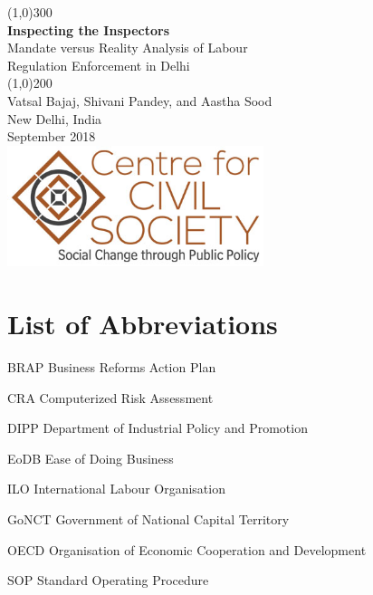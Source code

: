 \documentclass[a4paper, 12pt, twoside]{article}
\begin{document}

\begin{titlepage}
\begin{center}
\line(1,0){300}\\
[0.25in]
\huge{\bfseries\textcolor{CCSbrown} {Inspecting the Inspectors}} \\
[0.5cm]
\large{Mandate versus Reality Analysis of Labour \\Regulation Enforcement in Delhi} \\
    	
\line(1,0){200}\\
[3in]
\LARGE{Vatsal Bajaj, Shivani Pandey, and Aastha Sood} \\ 
[1.5cm]
{\normalsize New Delhi, India} \\
{\normalsize September 2018} \\
[2cm]
\includegraphics[width = 75mm]{CCSlogo.jpg}

\end{center}
\end{titlepage}

\tableofcontents

\newpage
{}

\section*{List of Abbreviations}

\begin{abbrv}
         
        \item[BRAP]			Business Reforms Action Plan
        \item[CRA]			Computerized Risk Assessment
        \item[DIPP]			Department of Industrial Policy and Promotion
        \item[EoDB]			Ease of Doing Business
        \item[ILO]				International Labour Organisation
        \item[GoNCT]			Government of National Capital Territory 
        \item[OECD]			Organisation of Economic Cooperation and Development
        \item[SOP]			Standard Operating Procedure 
              
\end{abbrv}
\end{document}
